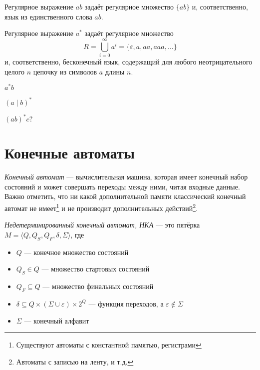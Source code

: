 \begin{example}
    Регулярное выражение $ab$ задаёт регулярное множество $\{ab\}$ и, соответственно, язык из единственного слова $ab$.    
\end{example}


\begin{example}
    Регулярное выражение $a^*$ задаёт регулярное множество $$R = \bigcup_{i=0}^{\infty}{a^i} = \{\varepsilon, a, aa, aaa, \ldots \}$$ и, соответственно, бесконечный язык, содержащий для любого неотрицательного целого $n$ цепочку из символов $a$ длины $n$.
\end{example}


\begin{example}
    $a^*b$
\end{example}

\begin{example}
    $(a\mid b)^*$
\end{example}

\begin{example}
    $(ab)^*c?$
\end{example}

\section{Конечные автоматы}

\textit{Конечный автомат} --- вычислительная машина, которая имеет конечный набор состояний и может совершать переходы между ними, читая входные данные. 
Важно отметить, что ни какой дополнительной памяти классический конечный автомат не имеет\footnote{Существуют автоматы с константной памятью, регистрами} и не производит дополнительных действий\footnote{Автоматы с записью на ленту, и т.д.}.

\begin{definition}\label{def:NondeterminicticFiniteAutomata}
    \textit{Недетерминированный конечный автомат, НКА} --- это пятёрка $M = \langle Q, Q_S, Q_F, \delta, \Sigma \rangle$, где
    \begin{itemize}
        \item $Q$ --- конечное множество состояний
        \item $Q_S \in Q$ --- множество стартовых состояний
        \item $Q_F \subseteq Q$ --- множество финальных состояний
        \item $\delta \subseteq Q \times (\Sigma \cup \varepsilon) \times 2^Q$ --- функция переходов, а $\varepsilon \notin \Sigma$
        \item $\Sigma$ --- конечный алфавит
    \end{itemize}
\end{definition}

